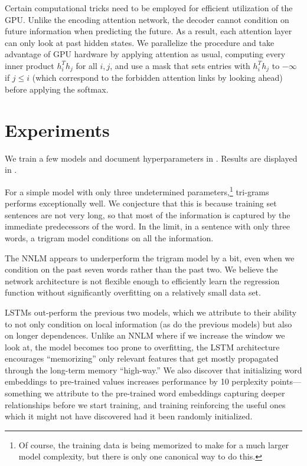 \documentclass[12pt]{article}
\begin{document}
Certain computational tricks need to be employed for efficient utilization of
the GPU. Unlike the encoding attention network, the decoder cannot condition on
future information when predicting the future. As a result, each attention layer
can only look at past hidden states. We parallelize the procedure and take
advantage of GPU hardware by applying attention as usual, computing every
inner product $h_i^T h_j$ for all $i,j$, and use a mask that sets entries with
$h_i^T h_j$
to $-\infty$ if $j \le i$ (which correspond to the forbidden attention
links by looking ahead) before applying the softmax.

\section{Experiments}
We train a few models and document hyperparameters in . Results
are displayed in . 

For a simple model with only three undetermined parameters,\footnote{Of course,
the training data is being memorized to make for a much larger model complexity,
but there is only one canonical way to do this.} tri-grams performs
exceptionally well. We conjecture that this is because training set sentences are not
very long, so that most of the information is captured by the immediate
predecessors of the word. In the limit, in a sentence with only three words,
a trigram model conditions on all the information.

The NNLM appears to underperform the trigram model by a bit, even when we
condition on the past seven words rather than the past two. We believe the
network architecture is not flexible enough to efficiently learn the regression
function without significantly overfitting on a relatively small data set.

LSTMs out-perform the previous two models, which we attribute to their ability
to not only condition on local information (as do the previous models) but also
on longer dependences. Unlike an NNLM where if we increase the window we look
at, the model becomes too prone to overfitting, the LSTM architecture encourages
``memorizing'' only relevant features that get mostly propagated through the
long-term memory ``high-way.'' We also discover that initializing word
embeddings to pre-trained values increases performance by 10 perplexity
points---something we attribute to the pre-trained word embeddings capturing
deeper relationships before we start training, and training reinforcing the
useful ones which it might not have discovered had it been randomly initialized.
\end{document}
